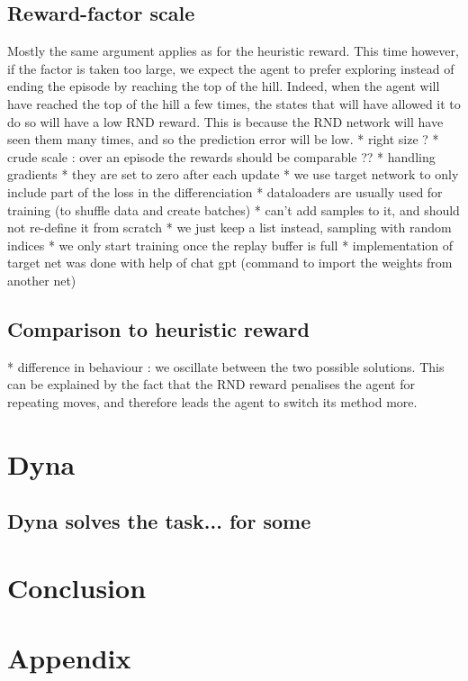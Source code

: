\documentclass[a4paper, 12pt,oneside]{article}
\begin{document}
            \subsection{Reward-factor scale}
            Mostly the same argument applies as for the heuristic reward. This time however, if the factor is taken too large, we expect the agent to prefer exploring instead of ending the episode by reaching the top of the hill. Indeed, when the agent will have reached the top of the hill a few times, the states that will have allowed it to do so will have a low RND reward. This is because the RND network will have seen them many times, and so the prediction error will be low.
            * right size ?
            * crude scale : over an episode the rewards should be comparable ?? 
            * handling gradients 
            * they are set to zero after each update
            * we use target network to only include part of the loss in the differenciation 
          * dataloaders are usually used for training (to shuffle data and create batches)
            * can't add samples to it, and should not re-define it from scratch 
              * we just keep a list instead, sampling with random indices 
          * we only start training once the replay buffer is full 
          * implementation of target net was done with help of chat gpt (command to import the weights from another net)
        \subsection{Comparison to heuristic reward}
        * difference in behaviour : we oscillate between the two possible solutions. This can be explained by the fact that the RND reward penalises the agent for repeating moves, and therefore leads the agent to switch its method more. 
        \section{Dyna}
        \subsection{Dyna solves the task... for some }
        \section{Conclusion}

        \section{Appendix}
\end{document}
